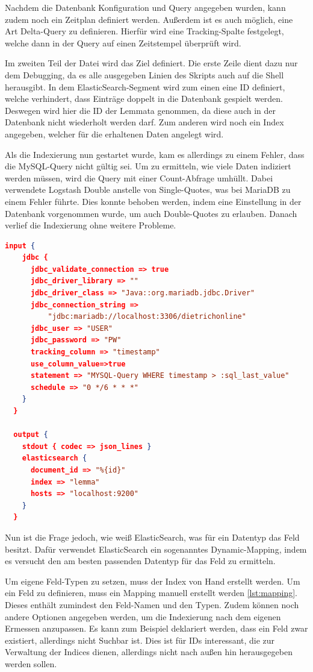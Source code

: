Nachdem die Datenbank Konfiguration und Query angegeben wurden, kann zudem noch ein Zeitplan definiert werden. Außerdem ist es auch möglich, eine Art Delta-Query zu definieren. Hierfür wird eine Tracking-Spalte festgelegt, welche dann in der Query auf einen Zeitstempel überprüft wird.

Im zweiten Teil der Datei wird das Ziel definiert. Die erste Zeile dient dazu nur dem Debugging, da es alle ausgegeben Linien des Skripts auch auf die Shell herausgibt. In dem ElasticSearch-Segment wird zum einen eine ID definiert, welche verhindert, dass Einträge doppelt in die Datenbank gespielt werden. Deswegen wird hier die ID der Lemmata genommen, da diese auch in der Datenbank nicht wiederholt werden darf. Zum anderen wird noch ein Index angegeben, welcher für die erhaltenen Daten angelegt wird. 

Als die Indexierung nun gestartet wurde, kam es allerdings zu einem Fehler, dass die MySQL-Query nicht gültig sei. Um zu ermitteln, wie viele Daten indiziert werden müssen, wird die Query mit einer Count-Abfrage umhüllt. Dabei verwendete Logstash Double anstelle von Single-Quotes, was bei MariaDB zu einem Fehler führte. Dies konnte behoben werden, indem eine Einstellung in der Datenbank vorgenommen wurde, um auch Double-Quotes zu erlauben. 
Danach verlief die Indexierung ohne weitere Probleme.

\begin{lstlisting}[language=json, frame=single, label={lst:lsConf}] 
  input {
    jdbc {
      jdbc_validate_connection => true
      jdbc_driver_library => ""
      jdbc_driver_class => "Java::org.mariadb.jdbc.Driver"
      jdbc_connection_string =>
          "jdbc:mariadb://localhost:3306/dietrichonline"
      jdbc_user => "USER"
      jdbc_password => "PW"
      tracking_column => "timestamp"
      use_column_value=>true
      statement => "MYSQL-Query WHERE timestamp > :sql_last_value"
      schedule => "0 */6 * * *"
    }
  }
  
  output {
    stdout { codec => json_lines }
    elasticsearch {
      document_id => "%{id}"
      index => "lemma"
      hosts => "localhost:9200"
    }
  }
\end{lstlisting}

Nun ist die Frage jedoch, wie weiß ElasticSearch, was für ein Datentyp das Feld besitzt. Dafür verwendet ElasticSearch ein sogenanntes Dynamic-Mapping, indem es versucht den am besten passenden Datentyp für das Feld zu ermitteln.

Um eigene Feld-Typen zu setzen, muss der Index von Hand erstellt werden. Um ein Feld zu definieren, muss ein Mapping manuell erstellt werden \ref{lst:mapping}. Dieses enthält zumindest den Feld-Namen und den Typen. Zudem können noch andere Optionen angegeben werden, um die Indexierung nach dem eigenen Ermessen anzupassen. Es kann zum Beispiel deklariert werden, dass ein Feld zwar existiert, allerdings nicht Suchbar ist. Dies ist für IDs interessant, die zur Verwaltung der Indices dienen, allerdings nicht nach außen hin herausgegeben werden sollen.

